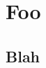 \documentclass[openany]{book}
\begin{document}
\tableofcontents
\part{Foo}
\chapter{Blah}
\end{document}

